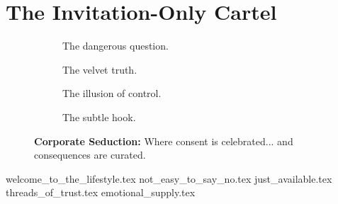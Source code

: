 
\section{The Invitation-Only Cartel}

\vfill

\begin{figure}[H]
    \centering

    \begin{subfigure}[t]{0.45\textwidth}
    \centering
    \caption*{The dangerous question.}
    \end{subfigure}
    \hfill
    \begin{subfigure}[t]{0.45\textwidth}
    \centering
    \caption*{The velvet truth.}
    \end{subfigure}

    \vspace{1em}

    \begin{subfigure}[t]{0.45\textwidth}
    \centering
    \caption*{The illusion of control.}
    \end{subfigure}
    \hfill
    \begin{subfigure}[t]{0.45\textwidth}
    \centering
    \caption*{The subtle hook.}
    \end{subfigure}

    \caption*{\textbf{Corporate Seduction:} Where consent is celebrated... and consequences are curated.}
\end{figure}



{welcome_to_the_lifestyle.tex}
{not_easy_to_say_no.tex}
{just_available.tex}
{threads_of_trust.tex}
{emotional_supply.tex}